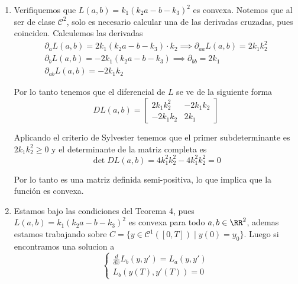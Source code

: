 \documentclass[a4paper,oneside,10.5pt]{USMArt}
\begin{document}
\begin{sol}
\begin{enumerate}
  \item Verifiquemos que $L(a, b) = k_{1}(k_{2}a - b - k_{3})^{2}$ es convexa.
        Notemos que al ser de clase $\mathcal{C}^{2}$, solo es necesario calcular una de las
        derivadas cruzadas, pues coinciden. Calculemos las derivadas
        \begin{gather*}
          \partial_{a} L(a, b) = 2k_{1}(k_{2}a - b -k_{3}) \cdot k_{2} \implies \partial_{aa}L(a, b) = 2k_{1}k_{2}^{2}\\
          \partial_{b} L(a, b) = -2k_{1}(k_{2}a - b - k_{3}) \implies \partial_{bb} = 2k_{1}\\
          \partial_{ab} L(a, b) = -2k_{1}k_{2}
        \end{gather*}

        Por lo tanto tenemos que el diferencial de $L$ se ve de la siguiente forma
        \begin{equation*}
          DL(a, b) = \begin{bmatrix}
            2k_{1}k_{2}^{2} & -2k_{1}k_{2}\\
            -2k_{1}k_{2}    & 2k_{1}
                     \end{bmatrix}
        \end{equation*}

        Aplicando el criterio de Sylvester tenemos que el primer subdeterminante es $2k_{1}k_{2}^{2} \geq 0$ y
        el determinante de la matriz completa es
        \begin{equation*}
          \det DL(a, b) = 4k_{1}^{2}k_{2}^{2} - 4k_{1}^{2}k_{2}^{2} = 0
        \end{equation*}

        Por lo tanto es una matriz definida semi-positiva, lo que implica que la función es convexa.

  \item Estamos bajo las condiciones del Teorema 4, pues $L(a, b) = k_{1}(k_{2}a - b -k_{3})^{2}$ es convexa
        para todo $a, b \in \RR^{2}$, ademas estamos trabajando sobre $C = \{y \in \mathcal{C}^{1}([0, T]) \; | \; y(0) = y_{0}\}$. Luego si encontramos una solucion a
        \begin{equation*}
        \begin{cases}
          \frac{d}{dx} L_b(y, y') = L_{a}(y, y')\\
          L_{b}(y(T), y'(T)) = 0
        \end{cases}
        \end{equation*}


\end{enumerate}
\end{sol}
\end{document}
